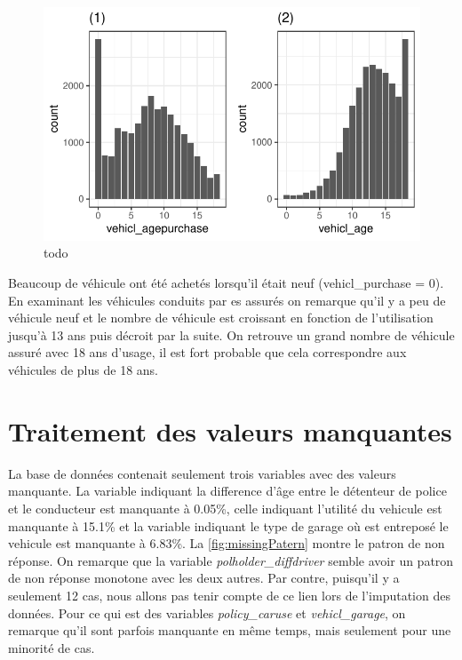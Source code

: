 \documentclass[
]{article}
\begin{document}
\begin{figure}

{\centering \includegraphics{01-01-Pretraitement_files/figure-latex/graph_age-1} 

}

\caption{\label{fig:}todo}\label{fig:graph_age}
\end{figure}

Beaucoup de véhicule ont été achetés lorsqu'il était neuf
(vehicl\_purchase = 0). En examinant les véhicules conduits par es
assurés on remarque qu'il y a peu de véhicule neuf et le nombre de
véhicule est croissant en fonction de l'utilisation jusqu'à 13 ans puis
décroit par la suite. On retrouve un grand nombre de véhicule assuré
avec 18 ans d'usage, il est fort probable que cela correspondre aux
véhicules de plus de 18 ans.

\newpage

\hypertarget{traitement-des-valeurs-manquantes}{%
\section{Traitement des valeurs
manquantes}\label{traitement-des-valeurs-manquantes}}

La base de données contenait seulement trois variables avec des valeurs
manquante. La variable indiquant la difference d'âge entre le détenteur
de police et le conducteur est manquante à 0.05\%, celle indiquant
l'utilité du vehicule est manquante à 15.1\% et la variable indiquant le
type de garage où est entreposé le vehicule est manquante à 6.83\%. La
\autoref{fig:missingPatern} montre le patron de non réponse. On remarque
que la variable \emph{polholder\_diffdriver} semble avoir un patron de
non réponse monotone avec les deux autres. Par contre, puisqu'il y a
seulement 12 cas, nous allons pas tenir compte de ce lien lors de
l'imputation des données. Pour ce qui est des variables
\emph{policy\_caruse} et \emph{vehicl\_garage}, on remarque qu'il sont
parfois manquante en même temps, mais seulement pour une minorité de
cas.
\end{document}
